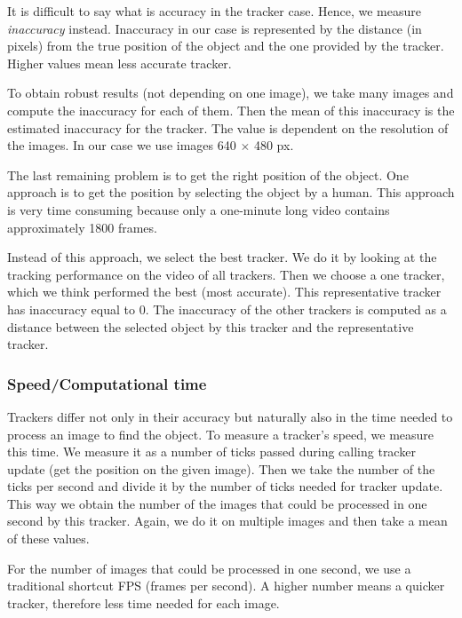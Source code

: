 It is difficult to say what is accuracy in the tracker case. Hence, we
measure \emph{inaccuracy} instead. Inaccuracy in our case is represented by the
distance (in pixels) from the true position of the object and the one provided
by the tracker. Higher values mean less accurate tracker.

To obtain robust results (not depending on one image), we take many images and
compute the inaccuracy for each of them. Then the mean of this inaccuracy is
the estimated inaccuracy for the tracker. The value is dependent on the
resolution of the images. In our case we use images 640 $\times$ 480 px.

The last remaining problem is to get the right position of the object. One
approach is to get the position by selecting the object by a human. This
approach is very time consuming because only a one-minute long video contains
approximately 1800 frames.

Instead of this approach, we select the best tracker. We do it by looking at
the tracking performance on the video of all trackers. Then we choose a one
tracker, which we think performed the best (most accurate). This representative
tracker has inaccuracy equal to 0.  The inaccuracy of the other trackers is
computed as a distance between the selected object by this tracker and the
representative tracker. 

\subsubsection*{Speed/Computational time}

Trackers differ not only in their accuracy but naturally also in the time
needed to process an image to find the object. To measure a tracker's speed,
we measure this time. We measure it as a number of ticks passed during calling
tracker update (get the position on the given image). Then we take the number
of the ticks per second and divide it by the number of ticks needed for tracker
update. This way we obtain the number of the images that could be processed in
one second by this tracker. Again, we do it on multiple images and then take a mean
of these values.

For the number of images that could be processed in one second, we use a
traditional shortcut FPS (frames per second). A higher number means a quicker
tracker, therefore less time needed for each image.

